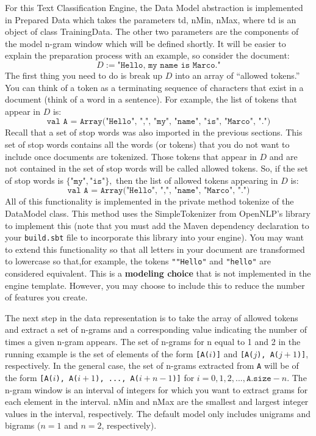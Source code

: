 \documentclass[a4paper,12pt]{article}
\renewcommand{\bf}[1]{\textbf{#1}}
\renewcommand{\tt}[1]{\texttt{#1}}
\newcommand{\3}{\left}
\newcommand{\4}{\right}
\renewcommand{\-}[1]{{}^{-#1}}
\begin{document}
For this Text Classification Engine, the Data Model abstraction is implemented in Prepared Data which takes the parameters td, nMin, nMax, where td is an object of class TrainingData. The other two parameters are the components of the model n-gram window which will be defined shortly. It will be easier to explain the preparation process with an example, so consider the document:
$$
D := \tt{"Hello, my name is Marco."}
$$
The first thing you need to do is break up $D$ into an array of \enquote{allowed tokens.} You can think of a token as a terminating sequence of characters that exist in a document (think of a word in a sentence). For example, the list of tokens that appear in $D$ is:
$$
\tt{val A = Array("Hello", ",", "my",  "name", "is", "Marco", ".")}
$$
Recall that a set of stop words was also imported in the previous sections. This set of stop words contains all the words (or tokens) that you do not want to include once documents are tokenized. Those tokens that appear in $D$ and are not contained in the set of stop words will be called allowed tokens. So, if the set of stop words is $\{\tt{"my"}, \tt{"is"}\},$ then the list of allowed tokens appearing in $D$ is:
$$
\tt{val A = Array("Hello", ",",  "name", "Marco", ".")}
$$
All of this functionality is implemented in the private method tokenize of the DataModel class. This method uses the SimpleTokenizer from OpenNLP's library to implement this (note that you must add the Maven dependency declaration to your \tt{build.sbt} file to incorporate this library into your engine). You may want to extend this functionality so that all letters in your document are transformed to lowercase so that,for example, the tokens \tt{""Hello"} and \tt{"hello"} are considered equivalent. This is a \bf{modeling choice} that is not implemented in the engine template. However, you may choose to include this to reduce the number of features you create. 

The next step in the data representation is to take the array of allowed tokens and extract a set of n-grams and a corresponding value indicating the number of times a given n-gram appears. The set of n-grams for n equal to 1 and 2 in the running example is the set of elements of the form \tt{[A($i$)]} and \tt{[A($j$), A($j + 1$)]}, respectively. In the general case, the set of n-grams extracted from \tt{A} will be of the form
\tt{[A($i$), A($i + 1$), ..., A($i + n - 1$)]} for $i = 0, 1, 2, ..., \tt{A.size} - n.$ The n-gram window is an interval of integers for which you want to extract grams for each element in the interval. nMin and nMax are the smallest and largest integer values in the interval, respectively. The default model only includes unigrams and bigrams ($n = 1$ and $n = 2$, respectively).
\end{document}

